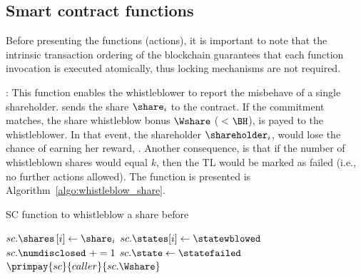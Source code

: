 \subsection{Smart contract functions}\label{sect:sc_functions}

Before presenting the functions (actions), it is important to note that the intrinsic transaction ordering of the blockchain guarantees that each function invocation is executed atomically, thus locking mechanisms are not required.


\smallskip
\texttt{\algowhistleblowshare}:
This function enables the whistleblower to report the misbehave of a single shareholder.
\whistleblower sends the share $\share_{i}$ to the contract.
If the commitment matches, the share whistleblow bonus $\Wshare$ ($<$$\BH$), is payed to the whistleblower.
In that event, the shareholder $\shareholder_{i}$, would lose the chance of earning her reward, \RH.
Another consequence, is that if the number of whistleblown shares would equal $k$, then the TL would be marked as failed (i.e., no further actions allowed).
The function is presented is Algorithm~\ref{algo:whistleblow_share}.

\begin{algorithm}[t]
	\caption{SC function to whistleblow a share before \td}\label{algo:whistleblow_share}
	\begin{algorithmic}[1]
		\vspace{0.6em}
		\State $sc.\shares \left[ i \right] \gets \share_{i}$
		\State $sc.\states[i]\gets \statewblowed$
		\State $sc.\numdisclosed\ += 1$
		\State $sc.\state\gets \statefailed$
		\EndIf
		\State $\primpay{sc}{caller}{sc.\Wshare}$
		\EndIf
		\EndIf
		\EndIf
		\EndProcedure
	\end{algorithmic}
\end{algorithm}


